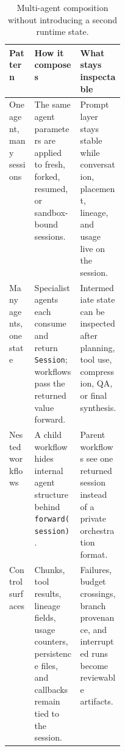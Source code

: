 \begin{table}[!htbp]
\vspace{0.1em}
\centering
\small
\caption{Multi-agent composition without introducing a second runtime state.}
\label{tab:compact-multi-agent-design}
\begin{tabularx}{\linewidth}{@{}>{\raggedright\arraybackslash}p{0.22\linewidth}>{\raggedright\arraybackslash}X>{\raggedright\arraybackslash}X@{}}
\toprule
Pattern & How it composes & What stays inspectable \\
\midrule
One agent, many sessions & The same agent parameters are applied to fresh, forked, resumed, or sandbox-bound sessions. & Prompt layer stays stable while conversation, placement, lineage, and usage live on the session. \\
Many agents, one state & Specialist agents each consume and return \texttt{Session}; workflows pass the returned value forward. & Intermediate state can be inspected after planning, tool use, compression, QA, or final synthesis. \\
Nested workflows & A child workflow hides internal agent structure behind \texttt{forward(session)}. & Parent workflows see one returned session instead of a private orchestration format. \\
Control surfaces & Chunks, tool results, lineage fields, usage counters, persistence files, and callbacks remain tied to the session. & Failures, budget crossings, branch provenance, and interrupted runs become reviewable artifacts. \\
\bottomrule
\end{tabularx}
\vspace{0.1em}
\end{table}
